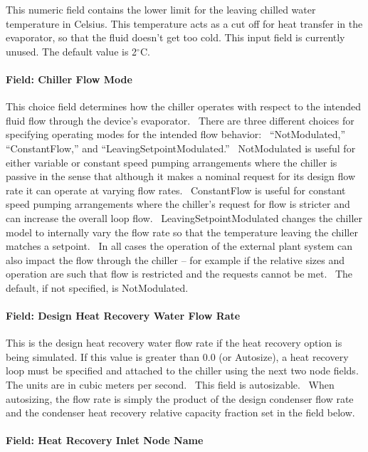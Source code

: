 This numeric field contains the lower limit for the leaving chilled water temperature in Celsius. This temperature acts as a cut off for heat transfer in the evaporator, so that the fluid doesn't get too cold. This input field is currently unused. The default value is 2$^\circ$C.

\paragraph{Field: Chiller Flow Mode}\label{field-chiller-flow-mode-4}

This choice field determines how the chiller operates with respect to the intended fluid flow through the device's evaporator.~ There are three different choices for specifying operating modes for the intended flow behavior:~ ``NotModulated,'' ``ConstantFlow,'' and ``LeavingSetpointModulated.''~ NotModulated is useful for either variable or constant speed pumping arrangements where the chiller is passive in the sense that although it makes a nominal request for its design flow rate it can operate at varying flow rates.~ ConstantFlow is useful for constant speed pumping arrangements where the chiller's request for flow is stricter and can increase the overall loop flow.~ LeavingSetpointModulated changes the chiller model to internally vary the flow rate so that the temperature leaving the chiller matches a setpoint.~ In all cases the operation of the external plant system can also impact the flow through the chiller -- for example if the relative sizes and operation are such that flow is restricted and the requests cannot be met.~ The default, if not specified, is NotModulated.

\paragraph{Field: Design Heat Recovery Water Flow Rate}\label{field-design-heat-recovery-water-flow-rate-1-000}

This is the design heat recovery water flow rate if the heat recovery option is being simulated. If this value is greater than 0.0 (or Autosize), a heat recovery loop must be specified and attached to the chiller using the next two node fields. The units are in cubic meters per second.~ This field is autosizable.~ When autosizing, the flow rate is simply the product of the design condenser flow rate and the condenser heat recovery relative capacity fraction set in the field below.

\paragraph{Field: Heat Recovery Inlet Node Name}\label{field-heat-recovery-inlet-node-name-1-000}

